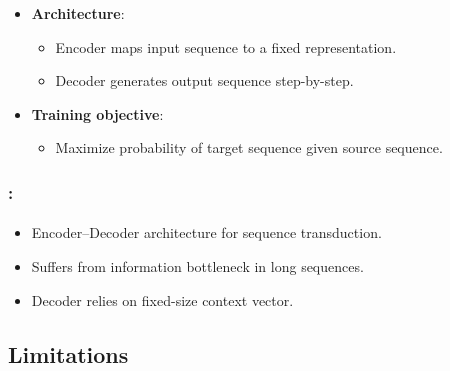 \documentclass[xcolor=table]{beamer}
\begin{document}
	\begin{subsectionframe}
		\begin{itemize}
			
			\item \textbf{Architecture}:
			\begin{itemize}
				\item Encoder maps input sequence to a fixed representation.
				\item Decoder generates output sequence step-by-step.
			\end{itemize}
			
			\item \textbf{Training objective}:
			\begin{itemize}
				\item Maximize probability of target sequence given source sequence.
			\end{itemize}
			
		\end{itemize}
	\end{subsectionframe}
	
	\begin{frame}
		\frametitle{\insertshortsubtitle: \insertsection}
		\framesubtitle{\insertsubsection}
		
		\begin{center}
		\end{center}
		
		\begin{itemize}
			\item Encoder--Decoder architecture for sequence transduction.
			\item Suffers from information bottleneck in long sequences.
			\item Decoder relies on fixed-size context vector.
		\end{itemize}
		
		
	\end{frame}
	
	\subsection{Limitations}
	
\end{document}
